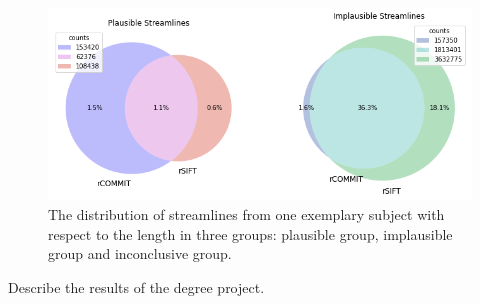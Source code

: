 \begin{figure}[ht]
    \centering
    \includegraphics[width= 15cm]{figures/comp_s_c.png}
        \caption{The distribution of streamlines from one exemplary subject with respect to the length in three groups: plausible group, implausible group and inconclusive group. }
    \label{fig:com_s_c}
\end{figure}


Describe the results of the degree project.
